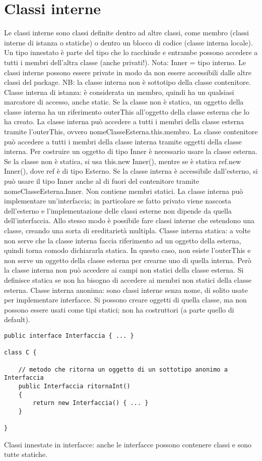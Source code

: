 \section{Classi interne}
Le classi interne sono classi definite dentro ad altre classi, come membro (classi interne di istanza o statiche) o dentro un blocco di codice (classe interna locale). Un tipo innestato è parte del tipo che lo racchiude e entrambe possono accedere a tutti i membri dell'altra classe (anche privati!). Nota: Inner = tipo interno.
Le classi interne possono essere private in modo da non essere accessibili dalle altre classi del package.
NB: la classe interna non è sottotipo della classe contenitore.
Classe interna di istanza: è considerata un membro, quindi ha un qualsiasi marcatore di accesso, anche static. Se la classe non è statica, un oggetto della classe interna ha un riferimento outerThis all'oggetto della classe esterna che lo ha creato.
La classe interna può accedere a tutti i membri della classe esterna tramite l'outerThis, ovvero nomeClasseEsterna.this.membro.
La classe contenitore può accedere a tutti i membri della classe interna tramite oggetti della classe interna.
Per costruire un oggetto di tipo Inner è necessario usare la classe esterna. Se la classe non è statica, si usa this.new Inner(), mentre se è statica ref.new Inner(), dove ref è di tipo Esterno.
Se la classe interna è accessibile dall'esterno, si può usare il tipo Inner anche al di fuori del contenitore tramite nomeClasseEsterna.Inner. 
Non contiene membri statici.
La classe interna può implementare un'interfaccia; in particolare se fatto privato viene nascosta dell'esterno e l'implementazione delle classi esterne non dipende da quella dell'interfaccia. Allo stesso modo è possibile fare classi interne che estendono una classe, creando una sorta di ereditarietà multipla.
Classe interna statica: a volte non serve che la classe interna faccia riferimento ad un oggetto della esterna, quindi torna comodo dichiararla statica. In questo caso, non esiste l'outerThis e non serve un oggetto della classe esterna per crearne uno di quella interna. Però la classe interna non può accedere ai campi non statici della classe esterna.
Si definisce statica se non ha bisogno di accedere ai membri non statici della classe esterna.
Classe interna anonima: sono classi interne senza nome, di solito usate per implementare interfacce. Si possono creare oggetti di quella classe, ma non possono essere usati come tipi statici; non ha costruttori (a parte quello di default). 

\begin{framed}
\begin{verbatim}
public interface Interfaccia { ... }

class C {
    
    // metodo che ritorna un oggetto di un sottotipo anonimo a Interfaccia
    public Interfaccia ritornaInt()
    {
        return new Interfaccia() { ... }
    }

}
\end{verbatim}
\end{framed}

 

Classi innestate in interfacce: anche le interfacce possono contenere classi e sono tutte statiche.

